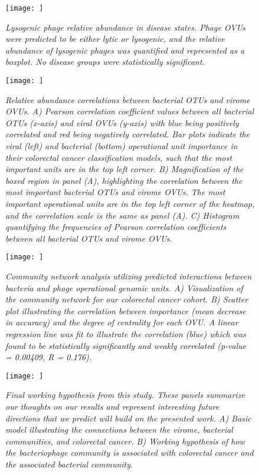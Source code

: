\documentclass[12pt,]{article}
\begin{document}
\newpage

\begin{figure}[htbp]
\centering
\texttt{[image: ]}
\caption{\emph{Lysogenic phage relative abundance in disease states.
Phage OVUs were predicted to be either lytic or lysogenic, and the
relative abundance of lysogenic phages was quantified and represented as
a boxplot. No disease groups were statistically
significant.}\label{replicationstyles}}
\end{figure}

\newpage

\begin{figure}[htbp]
\centering
\texttt{[image: ]}
\caption{\emph{Relative abundance correlations between bacterial OTUs
and virome OVUs. A) Pearson correlation coefficient values between all
bacterial OTUs (x-axis) and viral OVUs (y-axis) with blue being
positively correlated and red being negatively correlated. Bar plots
indicate the viral (left) and bacterial (bottom) operational unit
importance in their colorectal cancer classification models, such that
the most important units are in the top left corner. B) Magnification of
the boxed region in panel (A), highlighting the correlation between the
most important bacterial OTUs and virome OVUs. The most important
operational units are in the top left corner of the heatmap, and the
correlation scale is the same as panel (A). C) Histogram quantifying the
frequencies of Pearson correlation coefficients between all bacterial
OTUs and virome OVUs.}\label{correlations}}
\end{figure}

\newpage

\begin{figure}[htbp]
\centering
\texttt{[image: ]}
\caption{\emph{Community network analysis utilizing predicted
interactions between bacteria and phage operational genomic units. A)
Visualization of the community network for our colorectal cancer cohort.
B) Scatter plot illustrating the correlation between importance (mean
decrease in accuracy) and the degree of centrality for each OVU. A
linear regression line was fit to illustrate the correlation (blue)
which was found to be statistically significantly and weakly correlated
(p-value = 0.00409, R = 0.176).}\label{network}}
\end{figure}

\newpage

\begin{figure}[htbp]
\centering
\texttt{[image: ]}
\caption{\emph{Final working hypothesis from this study. These panels
summarize our thoughts on our results and represent interesting future
directions that we predict will build on the presented work. A) Basic
model illustrating the connections between the virome, bacterial
communities, and colorectal cancer. B) Working hypothesis of how the
bacteriophage community is associated with colorectal cancer and the
associated bacterial community.}\label{modelsummary}}
\end{figure}
\end{document}
